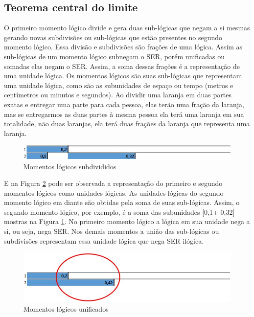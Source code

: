 \subsection{Teorema central do limite}

O primeiro momento lógico divide e gera duas sub-lógicas que negam a si mesmas gerando novas subdivisões ou sub-lógicas que estão presentes no segundo momento lógico. Essa divisão e subdivisões são frações de uma lógica.  Assim as sub-lógicas de um momento lógico subnegam o SER, porém unificadas ou somadas elas negam o SER. Assim, a soma dessas frações é a representação de uma unidade lógica. Os momentos lógicos são suas sub-lógicas que representam uma unidade lógica, como são as subunidades de espaço ou tempo (metros e centímetros ou minutos e segundos).  Ao dividir uma laranja em duas partes exatas e entregar uma parte para cada pessoa, elas terão uma fração da laranja, mas se entregarmos as duas partes à mesma pessoa ela terá uma laranja em sua totalidade, não duas laranjas, ela terá duas frações da laranja que representa uma laranja.

\begin{figure}[H]
\caption{Momentos lógicos subdivididos}
\label{fig:second_logical_moment}
\centering
\includegraphics[scale=.85]{sections/images/second_logical_moment.jpg}
\end{figure}

E na Figura \ref{fig:logical_units} pode ser observada a representação do primeiro e segundo momentos lógicos como unidades lógicas. As unidades lógicas do segundo momento lógico em diante são obtidas pela soma de suas sub-lógicas. Assim, o segundo momento lógico, por exemplo, é a soma das subunidades [0,1+ 0,32] mostras na Figura \ref{fig:second_logical_moment}. No primeiro momento lógico a lógica em sua unidade nega a si, ou seja, nega SER. Nos demais momentos a união das sub-lógicas ou subdivisões representam essa unidade lógica que nega SER ilógica.

\begin{figure}[H]
\caption{Momentos lógicos unificados}
\label{fig:logical_units}
\centering
\includegraphics[scale=.85]{sections/images/logical_units.jpg}
\end{figure}


